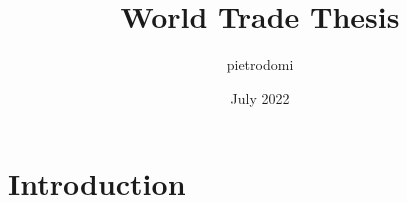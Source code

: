 \documentclass{article}
\title{World Trade Thesis}
\author{pietrodomi }
\date{July 2022}
\begin{document}
\maketitle

\section{Introduction}
\end{document}
